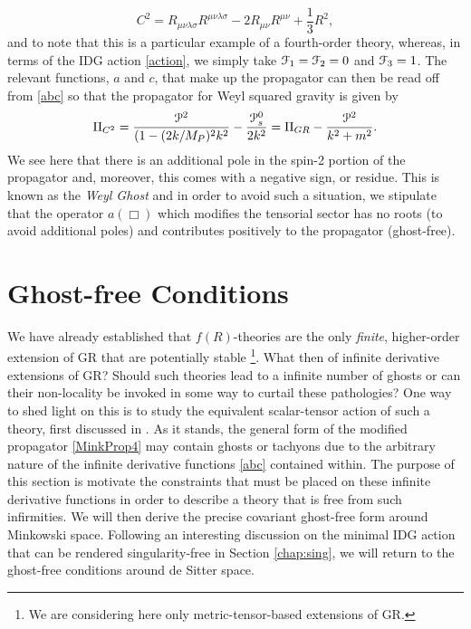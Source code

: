 \[
C^2=R_{\mu\nu\lambda\sigma}R^{\mu\nu\lambda\sigma}-2R_{\mu\nu}R^{\mu\nu}+\frac{1}{3}R^2
,\]
and to note that this is a particular example of a fourth-order  theory, whereas, in terms of the IDG action \eqref{action}, we simply take ${\cal F}_1={\cal F}_2=0$ and ${\cal F}_3=1$. The relevant functions, $a$ and $c$, that make up the propagator can then be read off from \eqref{abc} so that the propagator for Weyl squared gravity is given by 
\[
\Pi_{C^2}=\frac{{\cal P}^2}{(1-(2k/M_P)^2 k^2}-\frac{{\cal P}^0_s}{2k^2}=\Pi_{GR}-\frac{{\cal P}^2}{k^2+m^2}.
\]
We see here that there is an additional pole in the spin-2 portion of the propagator and, moreover, this comes with a negative sign, or residue. This is known as the \emph{Weyl Ghost} and in order to avoid such a situation, we stipulate that the operator $a(\Box)$ which modifies the tensorial sector has no roots (to avoid additional poles) and contributes positively to the propagator (ghost-free).\cite{Biswas:2013kla}
\section{Ghost-free Conditions}
We have already established that $f(R)$-theories are the only  \emph{finite}, higher-order extension of GR that are potentially stable \cite{Woodard:2015zca} \footnote{We are considering here only metric-tensor-based extensions of GR.}. What then of infinite derivative extensions of GR? Should such theories lead to a infinite number of ghosts or can their non-locality be invoked in some way to curtail these pathologies? One way to shed light on this is to study the equivalent scalar-tensor action of such a theory, first discussed in \cite{Biswas:2005qr}. As it stands, the general form of the modified propagator \eqref{MinkProp4} may contain ghosts or tachyons due to the arbitrary nature of the infinite derivative functions \eqref{abc} contained within. The purpose of this section is motivate the constraints that must be placed on these infinite derivative functions in order to describe a theory that is free from such infirmities. We will then derive the precise covariant ghost-free form around Minkowski space. Following an interesting discussion on the minimal IDG action that can be rendered singularity-free in Section \ref{chap:sing}, we will return to the ghost-free conditions around de Sitter space.
